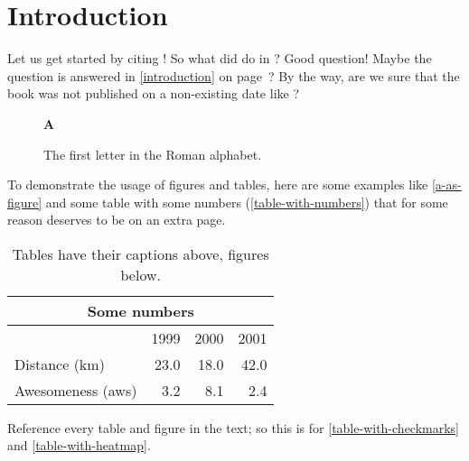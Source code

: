\chapter{Introduction} \label{introduction}

Let us get started by citing \citet{manning:2001}! So what did \citeauthor{manning:2001} do in \citeyear{manning:2001}? Good question!
Maybe the question is answered in \autoref{introduction} on page~\pageref{introduction}? 
By the way, are we sure that the book was not published on a non-existing date like ?

\begin{figure}[tb]%
  \begin{center}
    {\huge\bf A}
  \end{center}
  \caption{The first letter in the Roman alphabet.}\label{a-as-figure} %
\end{figure}

To demonstrate the usage of figures and tables, here are some examples like \autoref{a-as-figure} %
and some table with some numbers (\autoref{table-with-numbers}) that for some reason deserves to be on an extra page. 
%
%
\begin{table}[p]%
  \caption{Tables have their captions above, figures below.}
  \label{table-with-numbers}%
  \centering\small
  \begin{tabular}{@{}lrrr@{}} %
    \toprule
    \multicolumn{4}{c}{\bfseries Some numbers}\\
    \midrule
                      &   1999 & 2000 & 2001 \\
    \cmidrule(l){2-4} %
    Distance (km)     &   23.0 & 18.0 & 42.0 \\
    Awesomeness (aws) &    3.2 &  8.1 &  2.4 \\
    \bottomrule
  \end{tabular}
\end{table}
%
Reference every table and figure in the text; so this is for \autoref{table-with-checkmarks} and \autoref{table-with-heatmap}.

